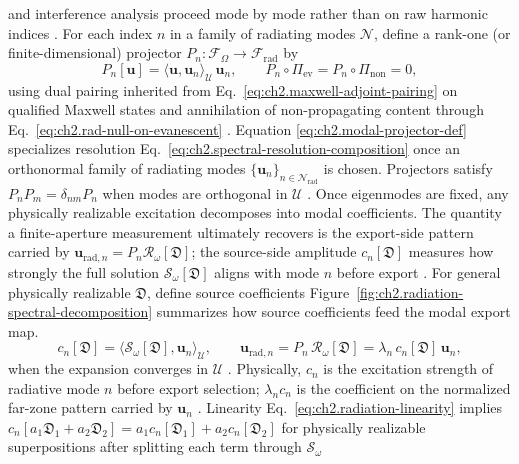and interference analysis proceed mode by mode rather than on raw harmonic indices
\cite{harrington2001}. For each index \(n\) in a family of radiating modes \(\mathcal{N}\), define a rank-one (or
finite-dimensional) projector \(P_n:\mathcal{F}_\Omega\to\mathcal{F}_{\mathrm{rad}}\) by
\begin{equation}
\label{eq:ch2.modal-projector-def}
P_n[\mathbf{u}]
=
\langle \mathbf{u},\mathbf{u}_n\rangle_{\mathcal{U}}\,\mathbf{u}_n,
\qquad
P_n\circ\Pi_{\mathrm{ev}}=P_n\circ\Pi_{\mathrm{non}}=0,
\end{equation}
using dual pairing inherited from Eq.~\eqref{eq:ch2.maxwell-adjoint-pairing} on qualified
Maxwell states and annihilation of non-propagating content through
Eq.~\eqref{eq:ch2.rad-null-on-evanescent} \cite{stratton1941}. Equation
\eqref{eq:ch2.modal-projector-def} specializes resolution
Eq.~\eqref{eq:ch2.spectral-resolution-composition} once an orthonormal family of radiating modes
\(\{\mathbf{u}_n\}_{n\in\mathcal{N}_{\mathrm{rad}}}\) is chosen. Projectors satisfy
\(P_n P_m=\delta_{nm} P_n\) when modes are orthogonal in \(\mathcal{U}\)
\cite{stratton1941}.
Once eigenmodes are fixed, any physically realizable excitation decomposes into modal
coefficients. The quantity a finite-aperture measurement ultimately recovers is the export-side
pattern carried by $\mathbf{u}_{\mathrm{rad},n}=P_n\mathcal{R}_\omega[\mathfrak{D}]$; the
source-side amplitude $c_n[\mathfrak{D}]$ measures how strongly the full solution
$\mathcal{S}_\omega[\mathfrak{D}]$ aligns with mode $n$ before export
\cite{stratton1941}. For general physically realizable \(\mathfrak{D}\), define source
coefficients
Figure~\ref{fig:ch2.radiation-spectral-decomposition} summarizes how source coefficients feed the
modal export map. 
\begin{equation}
\label{eq:ch2.source-modal-amplitude}
c_n[\mathfrak{D}]
=
\langle \mathcal{S}_\omega[\mathfrak{D}],\mathbf{u}_n\rangle_{\mathcal{U}},
\qquad
\mathbf{u}_{\mathrm{rad},n}
=
P_n\,\mathcal{R}_\omega[\mathfrak{D}]
=
\lambda_n\,c_n[\mathfrak{D}]\,\mathbf{u}_n,
\end{equation}
when the expansion converges in \(\mathcal{U}\) \cite{stratton1941}.
Physically, \(c_n\) is the excitation strength of radiative mode \(n\) before export
selection; \(\lambda_n c_n\) is the coefficient on the normalized far-zone pattern carried
by \(\mathbf{u}_n\) \cite{jackson1999}. Linearity
Eq.~\eqref{eq:ch2.radiation-linearity} implies
\(c_n[a_1\mathfrak{D}_1+a_2\mathfrak{D}_2]=a_1 c_n[\mathfrak{D}_1]+a_2 c_n[\mathfrak{D}_2]\)
for physically realizable superpositions after splitting each term through \(\mathcal{S}_\omega\)
